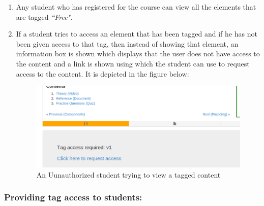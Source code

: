 \begin{enumerate}
	\item Any student who has registered for the course can view all the elements that are tagged \textit{``Free"}.
	
	\item If a student tries to access an element that has been tagged and if he has not been given access to that tag, then instead of showing that element, an information box is shown which displays that the user does not have access to the content and a link is shown using which the student can use to request access to the content. It is depicted in the figure below:
	\begin{figure}[h]
		\centering
		\includegraphics[width=0.8\linewidth]{./media/sAccessNot}
		\caption{An Uunauthorized student trying to view a tagged content}
		\label{fig:sAccessNot}
	\end{figure}

\end{enumerate}

\subsubsection*{Providing tag access to students:}

